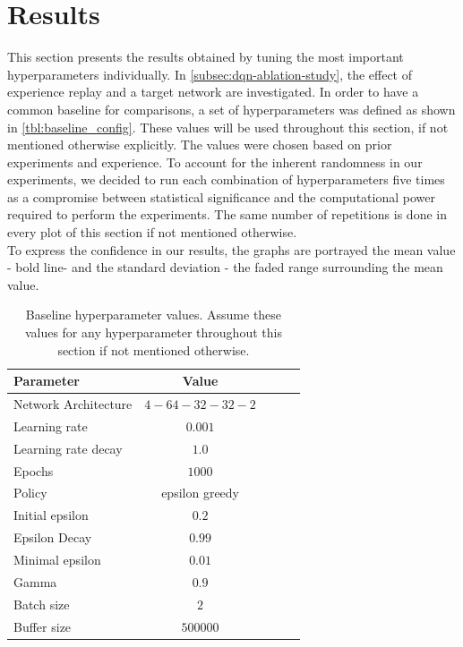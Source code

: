 \documentclass{article}
\begin{document}
\section{Results}
\label{sec:results}
This section presents the results obtained by tuning the most important hyperparameters individually. 
In \autoref{subsec:dqn-ablation-study}, the effect of experience replay and a target network are investigated.
In order to have a common baseline for comparisons, a set of hyperparameters was defined as shown in \autoref{tbl:baseline_config}. 
These values will be used throughout this section, if not mentioned otherwise explicitly.
The values were chosen based on prior experiments and experience.
To account for the inherent randomness in our experiments,
we decided to run each combination of hyperparameters five times as a compromise between statistical significance and the computational power required to perform the experiments. The same number of repetitions is done in every plot of this section if not mentioned otherwise.\\
To express the confidence in our results, the graphs are portrayed the mean value - bold line- and the standard deviation - the faded range surrounding the mean value.   

\begin{table}[ht]
   \caption{Baseline hyperparameter values. Assume these values for any hyperparameter throughout this section if not mentioned otherwise.}
   \label{tbl:baseline_config}
   \vskip 0.15in
   \begin{center}
   \begin{small}
   \begin{sc}
   \begin{tabular}{lcccr}
   \toprule
   Parameter & Value \\
   \midrule
   Network Architecture    & $4-64-32-32-2$ \\
   Learning rate           & $0.001$ \\
   Learning rate decay     & $1.0$   \\
   Epochs                  & $1000$ \\
   Policy                  & epsilon greedy \\
   Initial epsilon         & $0.2$ \\
   Epsilon Decay           & $0.99$ \\
   Minimal epsilon         & $0.01$ \\
   Gamma                   & $0.9$ \\
   Batch size              & $2$ \\
   Buffer size             & $500000$ \\
   \bottomrule
   \end{tabular}
   \end{sc}
   \end{small}
   \end{center}
   \vskip -0.1in
\end{table}
\end{document}
